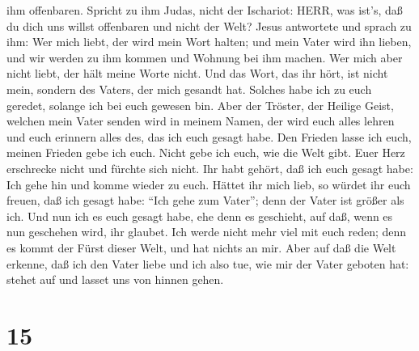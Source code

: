 ihm offenbaren.  Spricht zu ihm Judas, nicht der Ischariot:
HERR, was ist's, daß du dich uns willst offenbaren und nicht der Welt?
 Jesus antwortete und sprach zu ihm: Wer mich liebt, der
wird mein Wort halten; und mein Vater wird ihn lieben, und wir werden zu
ihm kommen und Wohnung bei ihm machen.  Wer mich aber nicht
liebt, der hält meine Worte nicht. Und das Wort, das ihr hört, ist nicht
mein, sondern des Vaters, der mich gesandt hat.  Solches
habe ich zu euch geredet, solange ich bei euch gewesen bin.
 Aber der Tröster, der Heilige Geist, welchen mein Vater
senden wird in meinem Namen, der wird euch alles lehren und euch
erinnern alles des, das ich euch gesagt habe.  Den Frieden
lasse ich euch, meinen Frieden gebe ich euch. Nicht gebe ich euch, wie
die Welt gibt. Euer Herz erschrecke nicht und fürchte sich nicht.
 Ihr habt gehört, daß ich euch gesagt habe: Ich gehe hin
und komme wieder zu euch. Hättet ihr mich lieb, so würdet ihr euch
freuen, daß ich gesagt habe: ``Ich gehe zum Vater''; denn der Vater ist
größer als ich.  Und nun ich es euch gesagt habe, ehe denn
es geschieht, auf daß, wenn es nun geschehen wird, ihr glaubet.
 Ich werde nicht mehr viel mit euch reden; denn es kommt
der Fürst dieser Welt, und hat nichts an mir.  Aber auf daß
die Welt erkenne, daß ich den Vater liebe und ich also tue, wie mir der
Vater geboten hat: stehet auf und lasset uns von hinnen gehen.

\hypertarget{section-14}{%
\section{15}\label{section-14}}

